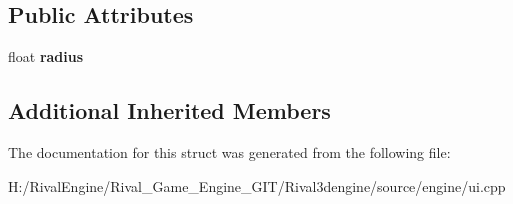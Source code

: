 \subsection*{Public Attributes}
\begin{DoxyCompactItemize}
\item 
\mbox{\label{struct_u_i_1_1_circle_a0361e309f2ad61fee6a4a7bd07d2a690}} 
float {\bfseries radius}
\end{DoxyCompactItemize}
\subsection*{Additional Inherited Members}


The documentation for this struct was generated from the following file\+:\begin{DoxyCompactItemize}
\item 
H\+:/\+Rival\+Engine/\+Rival\+\_\+\+Game\+\_\+\+Engine\+\_\+\+G\+I\+T/\+Rival3dengine/source/engine/ui.\+cpp\end{DoxyCompactItemize}
